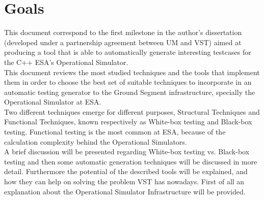 \section{Goals}
This document correspond to the first milestone in the author's dissertation (developed under a partnership agreement between UM and VST) aimed at producing a tool
that is able to automatically generate interesting testcases for the C++ ESA's Operational Simulator.\\
This document reviews the most studied techniques
and the tools that implement them in order to choose the best set of
suitable techniques to incorporate in an automatic
testing generator to the Ground Segment infrastructure, specially the
Operational Simulator at ESA.\\
Two different techniques emerge for different purposes, Structural
Techniques and Functional Techniques,
known respectively as White-box\cite{stt} testing and Black-box\cite{black} testing.
Functional testing is the most common at ESA, because of the
calculation complexity behind the Operational Simulators.\\
A brief discussion will be presented regarding White-box testing vs. Black-box
testing and then some automatic generation techniques will be discussed in more detail.
Furthermore the potential of the described tools will be explained, and how they can help
on solving the problem VST has nowadays. First of all an explanation about the Operational Simulator Infrastructure will be provided.


